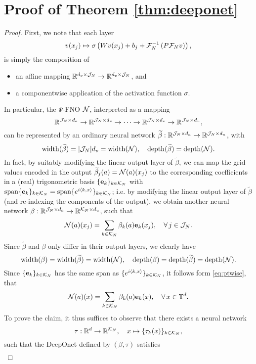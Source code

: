 \documentclass[reqno,a4paper]{amsart}
\begin{document}
\section{Proof of Theorem \ref{thm:deeponet}}
\label{app:E}
\begin{proof}
First, we note that each layer 
\[
v(x_j) \mapsto 
\sigma\left(
Wv(x_j) + b_j + \mathcal{F}^{-1}_N \left( P \mathcal{F}_N v \right)
\right),
\]
is simply the composition of 
\begin{itemize}
\item an affine mapping $\mathbb{R}^{d_v \times \mathcal{J}_N} \to \mathbb{R}^{d_v\times \mathcal{J}_N}$, and 
\item a componentwise application of the activation function $\sigma$.
\end{itemize}
In particular, the $\Psi$-FNO $\mathcal{N}$, interpreted as a mapping 
\[
\mathbb{R}^{\mathcal{J}_N \times d_a} 
\to 
\mathbb{R}^{\mathcal{J}_N \times d_v}
\to 
\dots
\to
\mathbb{R}^{\mathcal{J}_N \times d_v}
\to 
\mathbb{R}^{\mathcal{J}_N \times d_u},
\]
can be represented by an ordinary neural network $\widetilde{\beta}: \mathbb{R}^{\mathcal{J}_N \times d_a} \to \mathbb{R}^{\mathcal{J}_N \times d_u}$, with 
\[
\mathrm{width}(\widetilde{\beta}) = |\mathcal{J}_N| d_v = \mathrm{width}(\mathcal{N}),
\quad
\mathrm{depth}(\widetilde{\beta}) = \mathrm{depth}(\mathcal{N}).
\]
In fact, by suitably modifying the linear output layer of $\tilde{\beta}$, we can map the grid values encoded in the output $\widetilde{\beta}_j(a) = \mathcal{N}(a)(x_j)$ to the corresponding coefficients in a (real) trigonometric basis $\{\bm{\mathrm{e}}_k\}_{k\in \mathcal{K}_N}$ with $\mathrm{span}\{\bm{\mathrm{e}}_k\}_{k\in \mathcal{K}_N} = \mathrm{span}\{e^{i\langle k, x\rangle}\}_{k\in \mathcal{K}_N}$; i.e. by modifying the linear output layer of $\tilde{\beta}$ (and re-indexing the components of the output), we obtain another neural network $\beta: \mathbb{R}^{\mathcal{J}_N\times d_a} \to \mathbb{R}^{\mathcal{K}_N \times d_u}$, such that
\begin{align}\label{eq:ptwise}
\mathcal{N}(a)(x_j) = \sum_{k\in \mathcal{K}_N} \beta_k(a) \bm{\mathrm{e}}_k(x_j), \quad 
\forall \, j\in \mathcal{J}_N.
\end{align}
Since $\tilde{\beta}$ and $\beta$ only differ in their output layers, we clearly have
\[
\mathrm{width}({\beta}) =\mathrm{width}(\widetilde{\beta}) = \mathrm{width}(\mathcal{N}),
\quad
\mathrm{depth}({\beta}) =\mathrm{depth}(\widetilde{\beta}) = \mathrm{depth}(\mathcal{N}).
\]
Since $\{\bm{\mathrm{e}}_k\}_{k\in \mathcal{K}_N}$ has the same span as $\{e^{i\langle k, x\rangle}\}_{k\in \mathcal{K}_N}$, it follows form \eqref{eq:ptwise}, that 
\[
\mathcal{N}(a)(x) = \sum_{k\in \mathcal{K}_N} \beta_k(a) \bm{\mathrm{e}}_k(x), \quad 
\forall \, x\in \mathbb{T}^d.
\]
To prove the claim, it thus suffices to observe that there exists a neural network 
\[
\tau: \mathbb{R}^d \to \mathbb{R}^{\mathcal{K}_N},
\quad
x \mapsto \{\tau_k(x)\}_{k\in \mathcal{K}_N},
\]
such that the DeepOnet defined by $(\beta,\tau)$ satisfies
\begin{align*}

\end{align*}
\end{proof}
\end{document}
